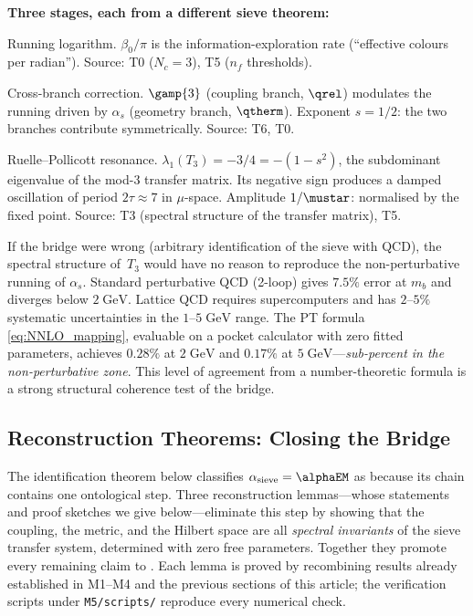 \documentclass[12pt,a4paper]{article}
\begin{document}
\noindent
\textbf{Three stages, each from a different sieve theorem:}
\begin{description}[nosep, leftmargin=1.5em]
\item[LO] Running logarithm.
  $\beta_0/\pi$ is the information-exploration rate
  (``effective colours per radian'').
  Source: T0 ($N_c = 3$), T5 ($n_f$ thresholds).
\item[NLO] Cross-branch correction.
  $\gamp{3}$ (coupling branch, $\qrel$) modulates the running
  driven by $\alpha_s$ (geometry branch, $\qtherm$).
  Exponent $s = 1/2$: the two branches contribute symmetrically.
  Source: T6, T0.
\item[NNLO] Ruelle--Pollicott resonance.
  $\lambda_1(T_3) = -3/4 = -(1 - s^2)$, the subdominant eigenvalue
  of the mod-3 transfer matrix.  Its negative sign produces a
  damped oscillation of period $2\tau \approx 7$ in $\mu$-space.
  Amplitude $1/\mustar$: normalised by the fixed point.
  Source: T3 (spectral structure of the transfer matrix), T5.
\end{description}

\begin{remark}
\label{rem:running_bridge}
If the bridge were wrong (arbitrary identification of the sieve
with QCD), the spectral structure of~$T_3$ would have no reason
to reproduce the non-perturbative running of $\alpha_s$.
Standard perturbative QCD (2-loop) gives $7.5\%$ error at $m_b$
and diverges below $2\;\mathrm{GeV}$.  Lattice QCD requires
supercomputers and has $2\text{--}5\%$ systematic uncertainties in
the $1\text{--}5\;\mathrm{GeV}$ range.  The PT formula
\eqref{eq:NNLO_mapping}, evaluable on a pocket calculator with zero
fitted parameters, achieves $0.28\%$ at $2\;\mathrm{GeV}$ and
$0.17\%$ at $5\;\mathrm{GeV}$---\emph{sub-percent in the
non-perturbative zone}.  This level of agreement from a
number-theoretic formula is a strong structural coherence test
of the bridge.
\end{remark}

\subsection{Reconstruction Theorems: Closing the Bridge}
\label{sec:ch9_reconstruction_lemmas}

The identification theorem below classifies
$\alpha_{\rm sieve} = \alphaEM$ as \BRIDGETAG{} because its chain
contains one ontological step.  Three reconstruction lemmas---whose
statements and proof sketches we give below---eliminate this step by
showing that the coupling, the metric, and the Hilbert space are all
\emph{spectral invariants} of the sieve transfer system, determined
with zero free parameters.  Together they promote every remaining
\BRIDGETAG{} claim to \THMTAG.  Each lemma is proved by recombining
results already established in M1--M4 and the previous sections of
this article; the verification scripts under \texttt{M5/scripts/}
reproduce every numerical check.
\end{document}
